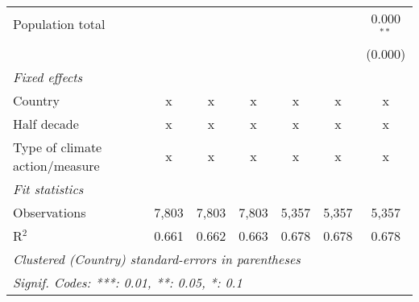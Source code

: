 \begin{tabular}{lcccccc}
   Population total                                             &               &                &                &                &                & 0.000$^{**}$\\   
                                                                &               &                &                &                &                & (0.000)\\   
   \emph{Fixed effects}\\
   Country                                                      & x             & x              & x              & x              & x              & x\\  
   Half decade                                                  & x             & x              & x              & x              & x              & x\\  
   Type of climate action/measure                               & x             & x              & x              & x              & x              & x\\  
   \midrule \emph{Fit statistics}\\
   Observations                                                 & 7,803         & 7,803          & 7,803          & 5,357          & 5,357          & 5,357\\  
   R$^2$                                                        & 0.661         & 0.662          & 0.663          & 0.678          & 0.678          & 0.678\\  
   \midrule
   \multicolumn{7}{l}{\emph{Clustered (Country) standard-errors in parentheses}}\\
   \multicolumn{7}{l}{\emph{Signif. Codes: ***: 0.01, **: 0.05, *: 0.1}}\\
\end{tabular}
\par\endgroup


